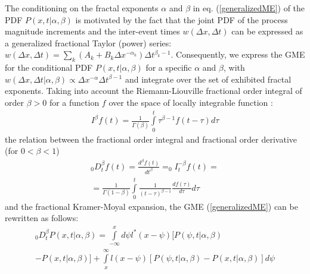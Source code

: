 The conditioning on the fractal exponents $\alpha$ and $\beta$ in eq. (\ref{generalizedME}) of the PDF $ P(x,t | \alpha, \beta)$ is motivated by the fact that the joint PDF of the process magnitude increments and the inter-event times $w(\Delta x, \Delta t)$ can be expressed as a generalized fractional Taylor (power) series: $w(\Delta x, \Delta t) = \sum\limits_{k} (A_{k}+ B_{k}\Delta x^{- \alpha_{k}} )\Delta t^{\beta_{k}-1}$. Consequently, we express the GME for the conditional PDF $P(x,t | \alpha, \beta)$ for a specific $\alpha$ and $\beta$, with $w(\Delta x, \Delta t | \alpha, \beta) \propto \Delta x^{-\alpha} \Delta t^{\beta -1}$ and integrate over the set of exhibited fractal exponents. Taking into account the Riemann-Liouville fractional order integral of order $\beta > 0$ for a function $f$ over the space of locally integrable function \cite{Oldham1974}:
\begin{eqnarray}
\label{RiemannLiouville}
&I^{\beta} f(t) = \frac{1}{\Gamma(\beta)}\int\limits_{0}^{t} \tau^{\beta-1}f(t-\tau) d\tau&
\end{eqnarray}
the relation between the fractional order integral and fractional order derivative (for $0 < \beta < 1$) 
\begin{eqnarray}
 & _{0}D_{t}^{\beta} f(t) = \frac{\displaystyle d^{\beta} f(t)}{\displaystyle dt^{\beta}} = _{0}I_{t}^{-\beta} f(t) = &\nonumber\\
 & = \frac{\displaystyle 1}{\displaystyle \Gamma(1-\beta)} \int\limits_{0}^{t} \frac{\displaystyle 1}{\displaystyle (t-\tau)^{\beta-1}}\frac{\displaystyle df(\tau)}{\displaystyle d\tau} d\tau &
\end{eqnarray}
and the fractional Kramer-Moyal expansion, the GME (\ref{generalizedME}) \cite{Herrmann2011} can be rewritten as follows:
\begin{eqnarray}
\label{GME1}
& _{0}D_{t}^{\beta} P(x,t | \alpha, \beta) = \int\limits_{-\infty}^{x} d\psi l^{*}(x-\psi) [ P(\psi,t | \alpha, \beta) & \nonumber\\
& - P(x,t | \alpha, \beta) ]  + \int\limits_{x}^{\infty} l(x-\psi) [ P(\psi,t | \alpha, \beta) - P(x,t | \alpha, \beta) ] d\psi  
\end{eqnarray}

